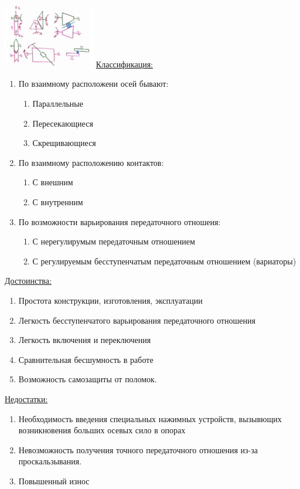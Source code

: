 \documentclass{article}
\begin{document}
\includegraphics[width = 0.3\textwidth]{18_1}
\underline{Классификация:} 
\begin{enumerate}
	\item По взаимному расположени осей бывают:
	\begin{enumerate}
		\item Параллельные
		\item Пересекающиеся
		\item Скрещивающиеся
	\end{enumerate}
	\item По взаимному расположению контактов:
	\begin{enumerate}
		\item С внешним
		\item С внутренним
	\end{enumerate}
	\item По возможности варьирования передаточного отношеия:
	\begin{enumerate}
		\item С нерегулирумым передаточным отношением
		\item С регулируемым бесступенчатым передаточным отношением (вариаторы)
	\end{enumerate}
\end{enumerate}

\underline{Достоинства:} 
\begin{enumerate}
	\item Простота конструкции, изготовления, эксплуатации
	\item Легкость бесступенчатого варьирования передаточного отношения
	\item Легкость включения и переключения
	\item Сравнительная бесшумность в работе
	\item Возможность самозащиты от поломок.
\end{enumerate}

\underline{Недостатки:}
\begin{enumerate}
	\item Необходимость введения специальных нажимных устройств, вызывющих возникновения больших осевых сило в опорах
	\item Невозможность получения точного передаточного отношения из-за проскальзывания.
	\item Повышенный износ
\end{enumerate}
\end{document}
